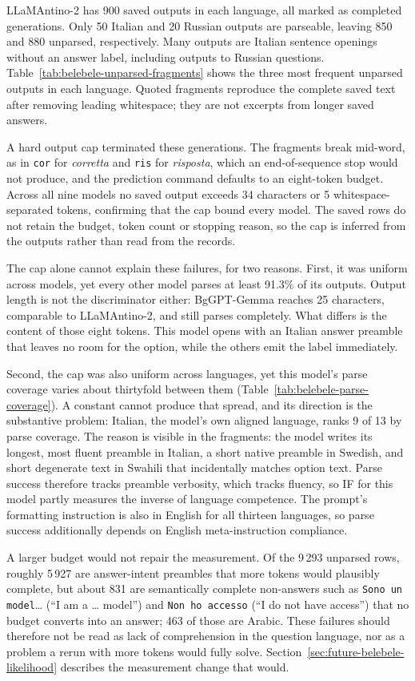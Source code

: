 LLaMAntino-2 has 900 saved outputs in each language, all marked as completed generations. Only 50 Italian and 20 Russian outputs are parseable, leaving 850 and 880 unparsed, respectively. Many outputs are Italian sentence openings without an answer label, including outputs to Russian questions. Table~\ref{tab:belebele-unparsed-fragments} shows the three most frequent unparsed outputs in each language. Quoted fragments reproduce the complete saved text after removing leading whitespace; they are not excerpts from longer saved answers.

A hard output cap terminated these generations. The fragments break mid-word, as in \texttt{cor} for \emph{corretta} and \texttt{ris} for \emph{risposta}, which an end-of-sequence stop would not produce, and the prediction command defaults to an eight-token budget. Across all nine models no saved output exceeds 34 characters or 5 whitespace-separated tokens, confirming that the cap bound every model. The saved rows do not retain the budget, token count or stopping reason, so the cap is inferred from the outputs rather than read from the records.

The cap alone cannot explain these failures, for two reasons. First, it was uniform across models, yet every other model parses at least 91.3\% of its outputs. Output length is not the discriminator either: BgGPT-Gemma reaches 25 characters, comparable to LLaMAntino-2, and still parses completely. What differs is the content of those eight tokens. This model opens with an Italian answer preamble that leaves no room for the option, while the others emit the label immediately.

Second, the cap was also uniform across languages, yet this model's parse coverage varies about thirtyfold between them (Table~\ref{tab:belebele-parse-coverage}). A constant cannot produce that spread, and its direction is the substantive problem: Italian, the model's own aligned language, ranks 9 of 13 by parse coverage. The reason is visible in the fragments: the model writes its longest, most fluent preamble in Italian, a short native preamble in Swedish, and short degenerate text in Swahili that incidentally matches option text. Parse success therefore tracks preamble verbosity, which tracks fluency, so IF for this model partly measures the inverse of language competence. The prompt's formatting instruction is also in English for all thirteen languages, so parse success additionally depends on English meta-instruction compliance.

A larger budget would not repair the measurement. Of the 9\,293 unparsed rows, roughly 5\,927 are answer-intent preambles that more tokens would plausibly complete, but about 831 are semantically complete non-answers such as \texttt{Sono un model}\ldots{} (``I am a \ldots{} model'') and \texttt{Non ho accesso} (``I do not have access'') that no budget converts into an answer; 463 of those are Arabic. These failures should therefore not be read as lack of comprehension in the question language, nor as a problem a rerun with more tokens would fully solve. Section~\ref{sec:future-belebele-likelihood} describes the measurement change that would.

